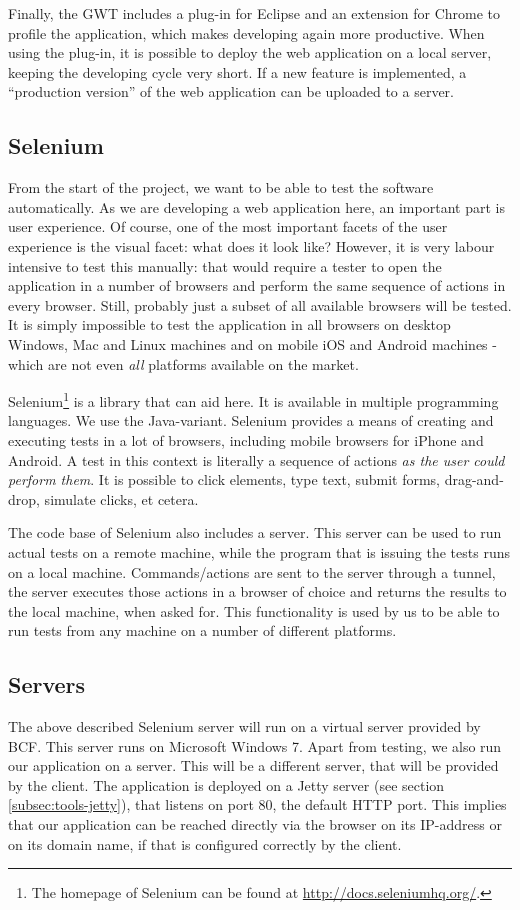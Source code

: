 Finally, the GWT includes a plug-in for Eclipse and an extension for Chrome to profile the application, which makes developing again more productive. When using the plug-in, it is possible to deploy the web application on a local server, keeping the developing cycle very short. If a new feature is implemented, a ``production version'' of the web application can be uploaded to a server.

\subsection{Selenium}
\label{subsec:tools-selenium}
From the start of the project, we want to be able to test the software automatically. As we are developing a web application here, an important part is user experience. Of course, one of the most important facets of the user experience is the visual facet: what does it look like? However, it is very labour intensive to test this manually: that would require a tester to open the application in a number of browsers and perform the same sequence of actions in every browser. Still, probably just a subset of all available browsers will be tested. It is simply impossible to test the application in all browsers on desktop Windows, Mac and Linux machines and on mobile iOS and Android machines - which are not even \emph{all} platforms available on the market.

Selenium\footnote{The homepage of Selenium can be found at \url{http://docs.seleniumhq.org/}.} is a library that can aid here. It is available in multiple programming languages. We use the Java-variant. Selenium provides a means of creating and executing tests in a lot of browsers, including mobile browsers for iPhone and Android. A test in this context is literally a sequence of actions \emph{as the user could perform them}. It is possible to click elements, type text, submit forms, drag-and-drop, simulate clicks, et cetera.

The code base of Selenium also includes a server. This server can be used to run actual tests on a remote machine, while the program that is issuing the tests runs on a local machine. Commands/actions are sent to the server through a tunnel, the server executes those actions in a browser of choice and returns the results to the local machine, when asked for. This functionality is used by us to be able to run tests from any machine on a number of different platforms.

\subsection{Servers}
\label{subsec:tools-server}
The above described Selenium server will run on a virtual server provided by BCF. This server runs on Microsoft Windows 7. Apart from testing, we also run our application on a server. This will be a different server, that will be provided by the client. The application is deployed on a Jetty server (see section \ref{subsec:tools-jetty}), that listens on port 80, the default HTTP port. This implies that our application can be reached directly via the browser on its IP-address or on its domain name, if that is configured correctly by the client.

